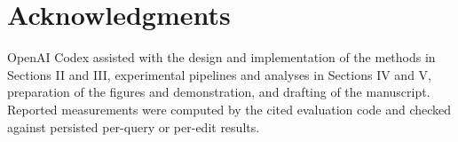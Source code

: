 \documentclass[conference]{IEEEtran}
\begin{document}
\section*{Acknowledgments}
OpenAI Codex assisted with the design and implementation of the methods in Sections II and III, experimental pipelines and analyses in Sections IV and V, preparation of the figures and demonstration, and drafting of the manuscript. Reported measurements were computed by the cited evaluation code and checked against persisted per-query or per-edit results.



\end{document}
